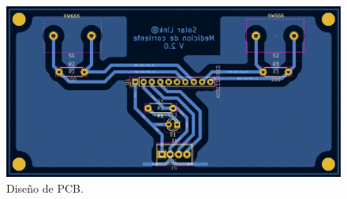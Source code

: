 \begin{figure}[H]
    \centering
    \includegraphics[width=0.9\linewidth]{hardware/Screenshot_12.png}
    \caption{Diseño de PCB.}
    \label{fig:pcb-corr}
\end{figure}


